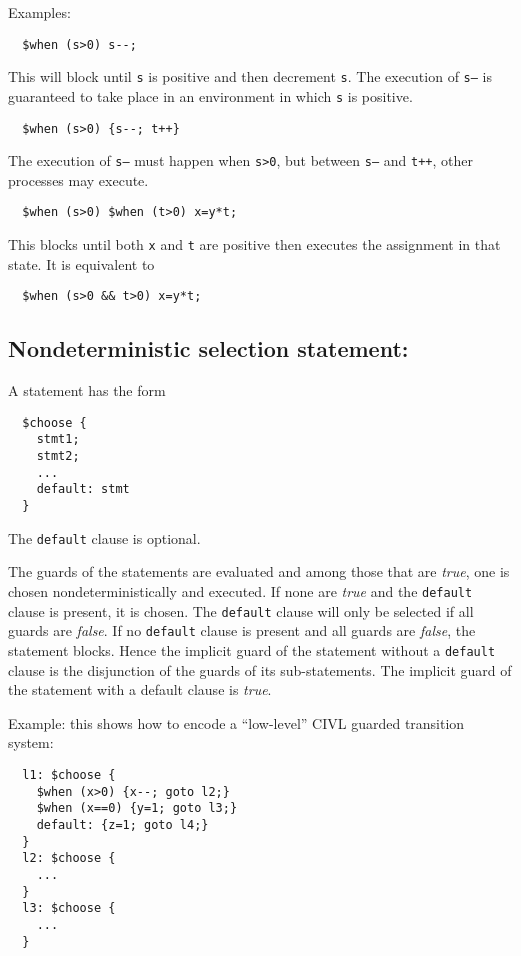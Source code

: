 Examples:
\begin{verbatim}
  $when (s>0) s--;
\end{verbatim}
This will block until \texttt{s} is positive and then decrement
\texttt{s}.  The execution of \texttt{s--} is guaranteed to take place
in an environment in which \texttt{s} is positive.

\begin{verbatim}
  $when (s>0) {s--; t++}
\end{verbatim}
The execution of \texttt{s--} must happen when \texttt{s>0}, but
between \texttt{s--} and \texttt{t++}, other processes may execute.

\begin{verbatim}
  $when (s>0) $when (t>0) x=y*t;
\end{verbatim}
This blocks until both \texttt{x} and \texttt{t} are positive then
executes the assignment in that state.  It is equivalent to
\begin{verbatim}
  $when (s>0 && t>0) x=y*t;
\end{verbatim}

\subsection{Nondeterministic selection statement: \cchoose}

A \cchoose{} statement has the form
\begin{verbatim}
  $choose {
    stmt1;
    stmt2;
    ...
    default: stmt
  }
\end{verbatim}
The \texttt{default} clause is optional.

The guards of the statements are evaluated and among those that are
\emph{true}, one is chosen nondeterministically and executed.  If none
are \emph{true} and the \texttt{default} clause is present, it is
chosen.  The \texttt{default} clause will only be selected if all
guards are \emph{false}.  If no \texttt{default} clause is present and
all guards are \emph{false}, the statement blocks.  Hence the implicit
guard of the \cchoose{} statement without a \texttt{default} clause is
the disjunction of the guards of its sub-statements.  The implicit
guard of the \cchoose{} statement with a default clause is
\emph{true}.

Example: this shows how to encode a ``low-level'' CIVL guarded
transition system:

\begin{verbatim}
  l1: $choose {
    $when (x>0) {x--; goto l2;}
    $when (x==0) {y=1; goto l3;}
    default: {z=1; goto l4;}
  }
  l2: $choose {
    ...
  }
  l3: $choose {
    ...
  }
\end{verbatim}


